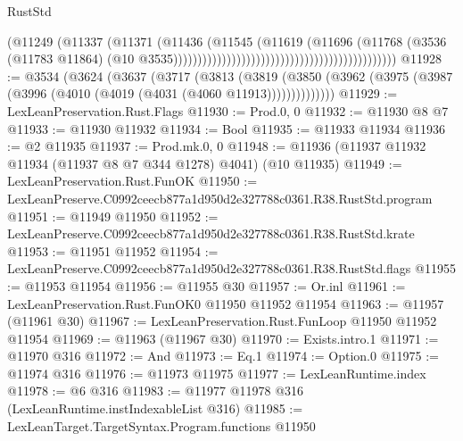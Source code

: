\begin{lexlean}{RustStd}
\begin{coremodule}
                                                                            (@11249
                                                                              (@11337
                                                                                (@11371
                                                                                  (@11436
                                                                                    (@11545
                                                                                      (@11619
                                                                                        (@11696
                                                                                          (@11768
                                                                                            (@3536
                                                                                              (@11783
                                                                                                @11864)
                                                                                              (@10
                                                                                                @3535))))))))))))))))))))))))))))))))))))))))))))))
@11928 := @3534
    (@3624
      (@3637
        (@3717
          (@3813
            (@3819
              (@3850 (@3962 (@3975 (@3987 (@3996 (@4010 (@4019 (@4031 (@4060 @11913))))))))))))))
@11929 := LexLeanPreservation.Rust.Flags
@11930 := Prod.{0, 0}
@11932 := @11930 @8 @7
@11933 := @11930 @11932
@11934 := Bool
@11935 := @11933 @11934
@11936 := @2 @11935
@11937 := Prod.mk.{0, 0}
@11948 := @11936 (@11937 @11932 @11934 (@11937 @8 @7 @344 @1278) @4041) (@10 @11935)
@11949 := LexLeanPreservation.Rust.FunOK
@11950 := LexLeanPreserve.C0992ceecb877a1d950d2e327788c0361.R38.RustStd.program
@11951 := @11949 @11950
@11952 := LexLeanPreserve.C0992ceecb877a1d950d2e327788c0361.R38.RustStd.krate
@11953 := @11951 @11952
@11954 := LexLeanPreserve.C0992ceecb877a1d950d2e327788c0361.R38.RustStd.flags
@11955 := @11953 @11954
@11956 := @11955 @30
@11957 := Or.inl
@11961 := LexLeanPreservation.Rust.FunOK0 @11950 @11952 @11954
@11963 := @11957 (@11961 @30)
@11967 := LexLeanPreservation.Rust.FunLoop @11950 @11952 @11954
@11969 := @11963 (@11967 @30)
@11970 := Exists.intro.{1}
@11971 := @11970 @316
@11972 := And
@11973 := Eq.{1}
@11974 := Option.{0}
@11975 := @11974 @316
@11976 := @11973 @11975
@11977 := LexLeanRuntime.index
@11978 := @6 @316
@11983 := @11977 @11978 @316 (LexLeanRuntime.instIndexableList @316)
@11985 := LexLeanTarget.TargetSyntax.Program.functions @11950

\end{coremodule}
\end{lexlean}

